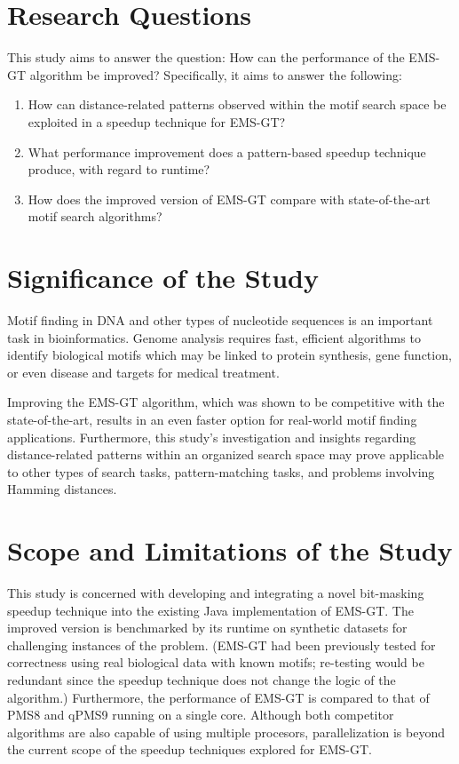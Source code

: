 \documentclass[oneside,12pt]{DISCSthesis}
\begin{document}
	\section{Research Questions}
		This study aims to answer the question: How can the performance of the EMS-GT algorithm be improved?
		Specifically, it aims to answer the following:

		\begin{enumerate}
		\item How can distance-related patterns observed within the motif search space be exploited in a speedup technique for EMS-GT?
		\item What performance improvement does a pattern-based speedup technique produce, with regard to runtime? %
		\item How does the improved version of EMS-GT compare with state-of-the-art motif search algorithms?
		\end{enumerate}

	\section{Significance of the Study}
		Motif finding in DNA and other types of nucleotide sequences is an important task in bioinformatics. Genome analysis requires fast, efficient algorithms to identify biological motifs which may be linked to protein synthesis, gene function, or even disease and targets for medical treatment. 

		Improving the EMS-GT algorithm, which was shown to be competitive with the state-of-the-art, results in an even faster option for real-world motif finding applications. Furthermore, this study's investigation and insights regarding distance-related patterns within an organized search space may prove applicable to other types of search tasks, pattern-matching tasks, and problems involving Hamming distances.

	\section{Scope and Limitations of the Study}
		This study is concerned with developing and integrating a novel bit-masking speedup technique into the existing Java implementation of EMS-GT. The improved version is benchmarked by its runtime on synthetic datasets for challenging instances of the problem. (EMS-GT had been previously tested for correctness using real biological data with known motifs; re-testing would be redundant since the speedup technique does not change the logic of the algorithm.)	
		Furthermore, the performance of EMS-GT is compared to that of PMS8 and qPMS9 running on a single core. Although both competitor algorithms are also capable of using multiple procesors, parallelization is beyond the current scope of the speedup techniques explored for EMS-GT.
\end{document}
